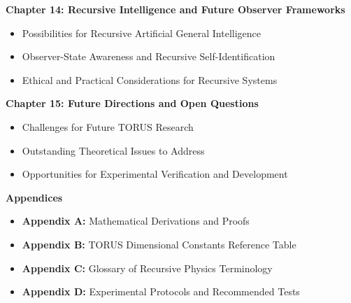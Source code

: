 \documentclass[]{article}
\begin{document}
\textbf{Chapter 14: Recursive Intelligence and Future Observer
Frameworks}

\begin{itemize}
\item
  Possibilities for Recursive Artificial General Intelligence
\item
  Observer-State Awareness and Recursive Self-Identification
\item
  Ethical and Practical Considerations for Recursive Systems
\end{itemize}

\textbf{Chapter 15: Future Directions and Open Questions}

\begin{itemize}
\item
  Challenges for Future TORUS Research
\item
  Outstanding Theoretical Issues to Address
\item
  Opportunities for Experimental Verification and Development
\end{itemize}

\textbf{Appendices}

\begin{itemize}
\item
  \textbf{Appendix A:} Mathematical Derivations and Proofs
\item
  \textbf{Appendix B:} TORUS Dimensional Constants Reference Table
\item
  \textbf{Appendix C:} Glossary of Recursive Physics Terminology
\item
  \textbf{Appendix D:} Experimental Protocols and Recommended Tests
\end{itemize}
\end{document}
